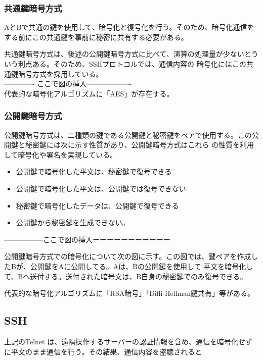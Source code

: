 \documentclass[12pt,a4paper,titlepage]{jsarticle}
\begin{document}
\subsubsection{共通鍵暗号方式}
AとBで共通の鍵を使用して、暗号化と復号化を行う。そのため、暗号化通信をする前にこの共通鍵を事前に秘密に共有する必要がある。

共通鍵暗号方式は、後述の公開鍵暗号方式に比べて、演算の処理量が少ないとういう利点ある。そのため、SSHプロトコルでは、通信内容の
暗号化にはこの共通鍵暗号方式を採用している。
\\------------- ここで図の挿入-------------------\\
代表的な暗号化アルゴリズムに「AES」が存在する。
\subsubsection{公開鍵暗号方式}
公開鍵暗号方式は、二種類の鍵である公開鍵と秘密鍵をペアで使用する。この公開鍵と秘密鍵には次に示す性質があり、公開鍵暗号方式はこれら
の性質を利用して暗号化や署名を実現している。
\begin{itemize}
    \item 公開鍵で暗号化した平文は、秘密鍵で復号できる
    \item 公開鍵で暗号化した平文は、公開鍵では復号できない
    \item 秘密鍵で暗号化したデータは、公開鍵で復号できる
    \item 公開鍵から秘密鍵を生成できない。
\end{itemize}

-----------------ここで図の挿入ーーーーーーーーーーー

公開鍵暗号方式での暗号化について次の図に示す。この図では、鍵ペアを作成したBが、公開鍵をAに公開してる。Aは、Bの公開鍵を使用して
平文を暗号化して、Bへ送付する。送付された暗号文は、B自身の秘密鍵でのみ復号できる。


代表的な暗号化アルゴリズムに「RSA暗号」「Diffi-Hellman鍵共有」等がある。
\subsection{SSH}
上記のTelnet は、遠隔操作するサーバーの認証情報を含め、通信を暗号化せずに平文のまま通信を行う。その結果、通信内容を盗聴されると
\end{document}
